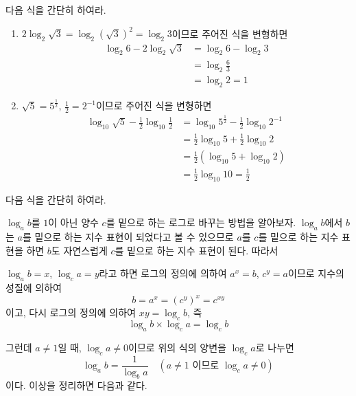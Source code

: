 \documentclass[11pt, a4paper]{book}
\begin{document}
\begin{example}
	다음 식을 간단히 하여라.
\begin{solution}
\begin{enumerate}[label=(\arabic*)]
	\item $2\log_{2}\sqrt{3}=\log_{2}(\sqrt{3})^{2}=\log_{2}3$이므로 주어진 식을 변형하면
	\begin{align*}
		\log_{2}6 - 2\log_{2}\sqrt{3}& =\log_{2}6 -\log_{2}3\\
		                                         	&=\log_{2}\frac{6}{3}\\
		                                     		&=\log_{2}2=1
	\end{align*}
	\item $\sqrt{5}= 5^{\frac{1}{2}}$, $\frac{1}{2}= 2^{-1}$이므로 주어진 식을 변형하면
	\begin{align*}
		\log_{10}\sqrt{5}-\frac{1}{2}\log_{10}\frac{1}{2}&=\log_{10}5^{\frac{1}{2}}-\frac{1}{2}\log_{10}2^{-1}\\
		&=\frac{1}{2}\log_{10}5 +\frac{1}{2}\log_{10}2\\
		&=\frac{1}{2}(\log_{10}5 +\log_{10}2)\\
	    &=\frac{1}{2}\log_{10}10 =\frac{1}{2}
	\end{align*}
\end{enumerate}
\end{solution}
\end{example}

\begin{problem}
	 다음 식을 간단히 하여라.
\end{problem}

$\log_{a}b$를 $1$이 아닌 양수 $c$를 밑으로 하는 로그로 바꾸는 방법을 알아보자. $\log_{a}b$에서 $b$는 $a$를 밑으로 하는 지수 표현이 되었다고 볼 수 있으므로 $a$를 $c$를 밑으로 하는 지수 표현을 하면 $b$도 자연스럽게 $c$를 밑으로 하는 지수 표현이 된다. 따라서 

$\log_{a}b=x$, $\log_{c}a=y$라고 하면 로그의 정의에 의하여 $a^{x}=b$, $c^{y}=a$이므로 지수의 성질에 의하여
\[
b=a^{x}=(c^{y})^{x}=c^{xy}
\]
이고, 다시 로그의 정의에 의하여 $xy=\log_{c}b$, 즉
\[
\log_{a}b\times\log_{c}a=\log_{c}b
\]

그런데 $a\ne1$일 때, $\log_{c}a\ne0$이므로 위의 식의 양변을 $\log_{c}a$로 나누면
\[
\log_{a}b =\frac{1}{\log_{b}a} \quad (a \ne 1 \text{ 이므로 } \log_{c}a \ne 0)
\]
이다. 이상을 정리하면 다음과 같다.
\end{document}
